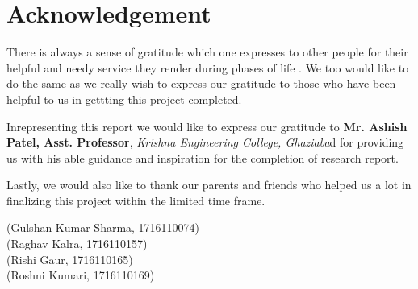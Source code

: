 	\chapter*{Acknowledgement}
There is always a sense of gratitude which one expresses to other people for their helpful and needy
service they render during phases of life . We too would like to do the same as we really wish to express
our gratitude to those who have been helpful to us in gettting this project completed.\vspace{.5cm}

Inrepresenting this report we would like to express our gratitude to \textbf{Mr. Ashish Patel, Asst.
	Professor}, \textit{Krishna Engineering College, Ghaziaba}d for providing us with his able guidance and
inspiration for the completion of research report.\vspace{.5cm}

Lastly, we would also like to thank our parents and friends who helped us a lot in finalizing this project
within the limited time frame.

\vspace{1.5cm}

\begin{minipage}[left]{1.3\linewidth}
	\begin{center}
		(Gulshan Kumar Sharma, 1716110074)\\
		(Raghav Kalra, 1716110157)\\
		(Rishi Gaur, 1716110165)\\
		(Roshni Kumari, 1716110169)
		
	\end{center}
	
\end{minipage}
